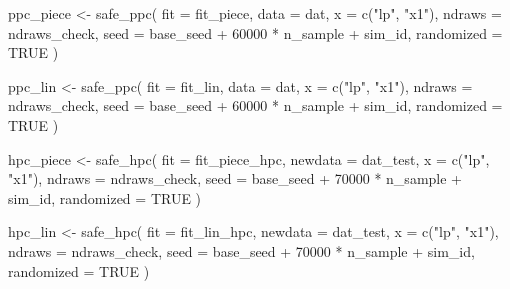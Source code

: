 \documentclass[
  english,
  letterpaper,
  DIV=11,
  numbers=noendperiod]{scrartcl}
\newenvironment{Shaded}{\begin{snugshade}}{\end{snugshade}}
\newcommand{\AttributeTok}[1]{\textcolor[rgb]{0.40,0.45,0.13}{#1}}
\newcommand{\ConstantTok}[1]{\textcolor[rgb]{0.56,0.35,0.01}{#1}}
\newcommand{\DecValTok}[1]{\textcolor[rgb]{0.68,0.00,0.00}{#1}}
\newcommand{\FunctionTok}[1]{\textcolor[rgb]{0.28,0.35,0.67}{#1}}
\newcommand{\NormalTok}[1]{\textcolor[rgb]{0.00,0.23,0.31}{#1}}
\newcommand{\OtherTok}[1]{\textcolor[rgb]{0.00,0.23,0.31}{#1}}
\newcommand{\SpecialCharTok}[1]{\textcolor[rgb]{0.37,0.37,0.37}{#1}}
\newcommand{\StringTok}[1]{\textcolor[rgb]{0.13,0.47,0.30}{#1}}
\begin{document}
\begin{Shaded}
\begin{Highlighting}[]
\NormalTok{  ppc\_piece }\OtherTok{\textless{}{-}} \FunctionTok{safe\_ppc}\NormalTok{(}
    \AttributeTok{fit =}\NormalTok{ fit\_piece,}
    \AttributeTok{data =}\NormalTok{ dat,}
    \AttributeTok{x =} \FunctionTok{c}\NormalTok{(}\StringTok{"lp"}\NormalTok{, }\StringTok{"x1"}\NormalTok{),}
    \AttributeTok{ndraws =}\NormalTok{ ndraws\_check,}
    \AttributeTok{seed =}\NormalTok{ base\_seed }\SpecialCharTok{+} \DecValTok{60000} \SpecialCharTok{*}\NormalTok{ n\_sample }\SpecialCharTok{+}\NormalTok{ sim\_id,}
    \AttributeTok{randomized =} \ConstantTok{TRUE}
\NormalTok{  )}

\NormalTok{  ppc\_lin }\OtherTok{\textless{}{-}} \FunctionTok{safe\_ppc}\NormalTok{(}
    \AttributeTok{fit =}\NormalTok{ fit\_lin,}
    \AttributeTok{data =}\NormalTok{ dat,}
    \AttributeTok{x =} \FunctionTok{c}\NormalTok{(}\StringTok{"lp"}\NormalTok{, }\StringTok{"x1"}\NormalTok{),}
    \AttributeTok{ndraws =}\NormalTok{ ndraws\_check,}
    \AttributeTok{seed =}\NormalTok{ base\_seed }\SpecialCharTok{+} \DecValTok{60000} \SpecialCharTok{*}\NormalTok{ n\_sample }\SpecialCharTok{+}\NormalTok{ sim\_id,}
    \AttributeTok{randomized =} \ConstantTok{TRUE}
\NormalTok{  )}

\NormalTok{  hpc\_piece }\OtherTok{\textless{}{-}} \FunctionTok{safe\_hpc}\NormalTok{(}
    \AttributeTok{fit =}\NormalTok{ fit\_piece\_hpc,}
    \AttributeTok{newdata =}\NormalTok{ dat\_test,}
    \AttributeTok{x =} \FunctionTok{c}\NormalTok{(}\StringTok{"lp"}\NormalTok{, }\StringTok{"x1"}\NormalTok{),}
    \AttributeTok{ndraws =}\NormalTok{ ndraws\_check,}
    \AttributeTok{seed =}\NormalTok{ base\_seed }\SpecialCharTok{+} \DecValTok{70000} \SpecialCharTok{*}\NormalTok{ n\_sample }\SpecialCharTok{+}\NormalTok{ sim\_id,}
    \AttributeTok{randomized =} \ConstantTok{TRUE}
\NormalTok{  )}

\NormalTok{  hpc\_lin }\OtherTok{\textless{}{-}} \FunctionTok{safe\_hpc}\NormalTok{(}
    \AttributeTok{fit =}\NormalTok{ fit\_lin\_hpc,}
    \AttributeTok{newdata =}\NormalTok{ dat\_test,}
    \AttributeTok{x =} \FunctionTok{c}\NormalTok{(}\StringTok{"lp"}\NormalTok{, }\StringTok{"x1"}\NormalTok{),}
    \AttributeTok{ndraws =}\NormalTok{ ndraws\_check,}
    \AttributeTok{seed =}\NormalTok{ base\_seed }\SpecialCharTok{+} \DecValTok{70000} \SpecialCharTok{*}\NormalTok{ n\_sample }\SpecialCharTok{+}\NormalTok{ sim\_id,}
    \AttributeTok{randomized =} \ConstantTok{TRUE}
\NormalTok{  )}


\end{Highlighting}
\end{Shaded}
\end{document}
